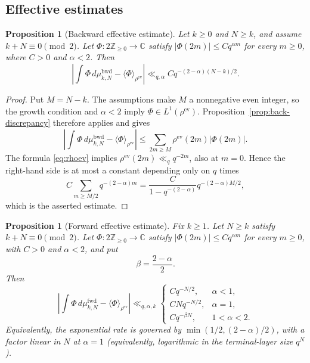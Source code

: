 \documentclass[11pt]{amsart}
\theoremstyle{definition}
\theoremstyle{plain}
\newtheorem{proposition}[definition]{Proposition}
\newcommand{\ZZ}{\mathbb Z}
\newcommand{\CC}{\mathbb C}
\newcommand{\fwd}{\mathrm{fwd}}
\newcommand{\bwd}{\mathrm{bwd}}
\newcommand{\ev}{\mathrm{ev}}
\newcommand{\ang}{\langle}
\newcommand{\rang}{\rangle}
\begin{document}
\subsection{Effective estimates}
\begin{proposition}[Backward effective estimate]\label{prop:effective-back}
Let \(k\ge0\) and \(N\ge k\), and assume
\(k+N\equiv0\pmod2\).  Let
\(\Phi:2\ZZ_{\ge0}\to\CC\) satisfy
\(|\Phi(2m)|\le Cq^{\alpha m}\) for every \(m\ge0\), where \(C>0\) and
\(\alpha<2\).  Then
\[
\left|\int \Phi\,d\mu^{\bwd}_{k,N}-\ang\Phi\rang_{\rho^{\ev}}\right|
\ll_{q,\alpha} C q^{-(2-\alpha)(N-k)/2}.
\]
\end{proposition}

\begin{proof}
Put \(M=N-k\).  The assumptions make \(M\) a nonnegative even integer, so
the growth condition and \(\alpha<2\) imply
\(\Phi\in L^1(\rho^{\ev})\).  Proposition~\ref{prop:back-discrepancy} therefore
applies and gives
\[
\left|\int \Phi\,d\mu^{\bwd}_{k,N}
      -\ang\Phi\rang_{\rho^{\ev}}\right|
 \le \sum_{2m\ge M}\rho^{\ev}(2m)|\Phi(2m)|.
\]
The formula \eqref{eq:rhoev} implies
\(\rho^{\ev}(2m)\ll_q q^{-2m}\), also at \(m=0\).  Hence the right-hand side
is at most a constant depending only on \(q\) times
\[
C\sum_{m\ge M/2}q^{-(2-\alpha)m}
 =\frac{C}{1-q^{-(2-\alpha)}}q^{-(2-\alpha)M/2},
\]
which is the asserted estimate.
\end{proof}

\begin{proposition}[Forward effective estimate]\label{prop:effective-forward}
Fix \(k\ge1\).  Let \(N\ge k\) satisfy
\(k+N\equiv0\pmod2\).  Let
\(\Phi:2\ZZ_{\ge0}\to\CC\) satisfy
\(|\Phi(2m)|\le Cq^{\alpha m}\) for every \(m\ge0\), with \(C>0\) and
\(\alpha<2\), and put
\[
\beta=\frac{2-\alpha}{2}.
\]
Then
\[
\left|\int \Phi\,d\mu^{\fwd}_{k,N}-\ang\Phi\rang_{\rho^{\ev}}\right|
\ll_{q,\alpha,k}
\begin{cases}
Cq^{-N/2}, & \alpha<1,\\
CNq^{-N/2}, & \alpha=1,\\
Cq^{-\beta N}, & 1<\alpha<2.
\end{cases}
\]
Equivalently, the exponential rate is governed by
\(\min(1/2,(2-\alpha)/2)\), with a factor linear in \(N\) at \(\alpha=1\)
(equivalently, logarithmic in the terminal-layer size \(q^N\)).
\end{proposition}
\end{document}
